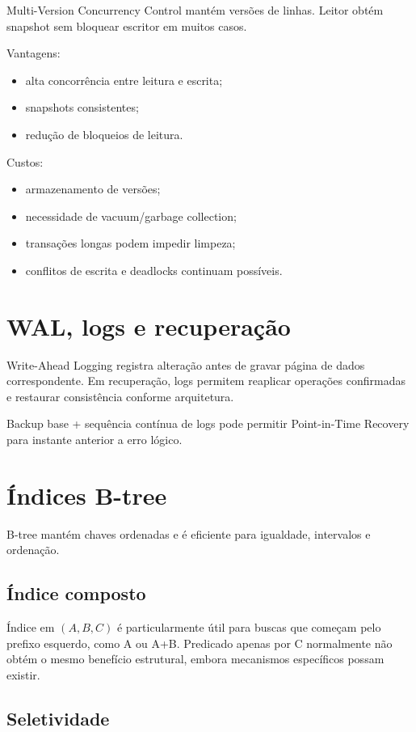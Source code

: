 Multi-Version Concurrency Control mantém versões de linhas. Leitor obtém snapshot sem bloquear escritor em muitos casos.

Vantagens:
\begin{itemize}
\item alta concorrência entre leitura e escrita;
\item snapshots consistentes;
\item redução de bloqueios de leitura.
\end{itemize}

Custos:
\begin{itemize}
\item armazenamento de versões;
\item necessidade de vacuum/garbage collection;
\item transações longas podem impedir limpeza;
\item conflitos de escrita e deadlocks continuam possíveis.
\end{itemize}

\section{WAL, logs e recuperação}

Write-Ahead Logging registra alteração antes de gravar página de dados correspondente. Em recuperação, logs permitem reaplicar operações confirmadas e restaurar consistência conforme arquitetura.

Backup base + sequência contínua de logs pode permitir Point-in-Time Recovery para instante anterior a erro lógico.

\section{Índices B-tree}

B-tree mantém chaves ordenadas e é eficiente para igualdade, intervalos e ordenação.

\subsection{Índice composto}

Índice em $(A,B,C)$ é particularmente útil para buscas que começam pelo prefixo esquerdo, como A ou A+B. Predicado apenas por C normalmente não obtém o mesmo benefício estrutural, embora mecanismos específicos possam existir.

\subsection{Seletividade}

